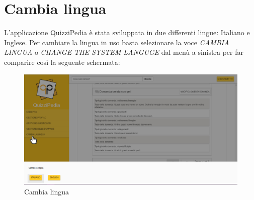 \newpage
\section{Cambia lingua}
L'applicazione QuizziPedia è stata sviluppata in due differenti lingue: Italiano e Inglese. Per cambiare la lingua in uso basta selezionare la voce \textit{CAMBIA LINGUA} o \textit{CHANGE THE SYSTEM LANGUGE} dal menù a sinistra per far comparire così la seguente schermata:

 \label{CambiaLingua}
 \begin{figure}[ht]
 	\centering
 	\includegraphics[scale=0.35]{img/cambia_lingua.png}
 	\caption{Cambia lingua}
 \end{figure}
 \FloatBarrier